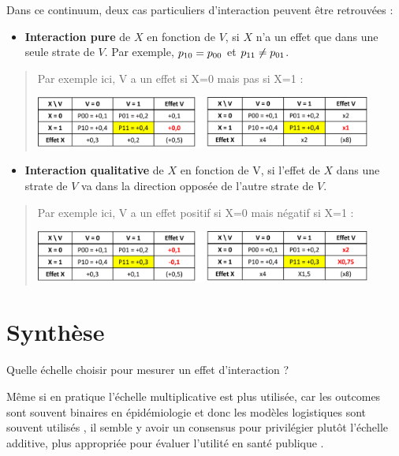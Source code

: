 \documentclass[
]{book}
\providecommand{\tightlist}{%
  \setlength{\itemsep}{0pt}\setlength{\parskip}{0pt}}
\begin{document}
Dans ce continuum, deux cas particuliers d'interaction peuvent être retrouvées :

\begin{itemize}
\tightlist
\item
  \textbf{Interaction pure} de \(X\) en fonction de \(V\), si \(X\) n'a un effet que dans une seule strate de \(V\). Par exemple, \(\small p_{10} = p_{00}\) et \(\small p_{11} \neq p_{01}\).
\end{itemize}

\begin{quote}
Par exemple ici, V a un effet si X=0 mais pas si X=1 :

\includegraphics[width=0.9\textwidth,height=\textheight]{img/Image8.png}
\end{quote}

\begin{itemize}
\tightlist
\item
  \textbf{Interaction qualitative} de \(X\) en fonction de V, si l'effet de \(X\) dans une strate de \(V\) va dans la direction opposée de l'autre strate de \(V\).
\end{itemize}

\begin{quote}
Par exemple ici, V a un effet positif si X=0 mais négatif si X=1 :

\includegraphics[width=0.9\textwidth,height=\textheight]{img/Image9.png}
\end{quote}

\hypertarget{synthuxe8se-1}{%
\section{Synthèse}\label{synthuxe8se-1}}

Quelle échelle choisir pour mesurer un effet d'interaction ?

Même si en pratique l'échelle multiplicative est plus utilisée, car les outcomes sont souvent binaires en épidémiologie et donc les modèles logistiques sont souvent utilisés \citet{knol_recommendations_2012}, il semble y avoir un consensus pour privilégier plutôt l'échelle additive, plus appropriée pour évaluer l'utilité en santé publique \citet{vanderweele_tutorial_2014} \citet{knol_recommendations_2012}.
\end{document}

